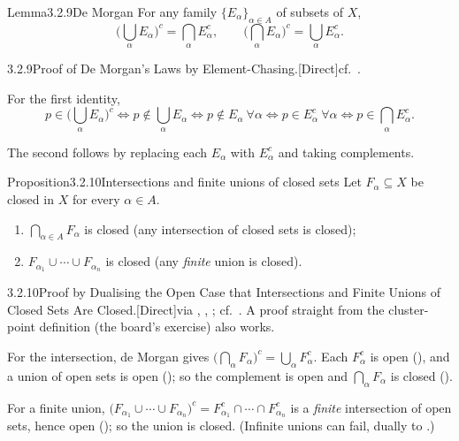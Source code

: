 \documentclass[main.tex]{subfiles}
\begin{document}
\begin{Obj}{Lemma}{3.2.9}{De Morgan}
For any family $\{E_\alpha\}_{\alpha\in A}$ of subsets of $X$,
\[ \Big(\bigcup_{\alpha}E_\alpha\Big)^c=\bigcap_\alpha E_\alpha^c,\qquad
   \Big(\bigcap_{\alpha}E_\alpha\Big)^c=\bigcup_\alpha E_\alpha^c. \]
\end{Obj}
\begin{Prf}{3.2.9}{Proof of De Morgan's Laws by Element-Chasing.}{[Direct]\quad cf.\ .}
\item For the first identity,
  \[ p\in\Big(\bigcup_\alpha E_\alpha\Big)^c \iff p\notin\bigcup_\alpha E_\alpha
     \iff p\notin E_\alpha\ \forall\alpha \iff p\in E_\alpha^c\ \forall\alpha
     \iff p\in\bigcap_\alpha E_\alpha^c. \]
\item The second follows by replacing each $E_\alpha$ with $E_\alpha^c$ and taking complements.
\end{Prf}

\begin{Obj}{Proposition}{3.2.10}{Intersections and finite unions of closed sets}
Let $F_\alpha\subseteq X$ be closed in $X$ for every $\alpha\in A$.
\begin{enumerate}
  \item $\bigcap_{\alpha\in A}F_\alpha$ is closed (any intersection of closed sets is closed);
  \item $F_{\alpha_1}\cup\cdots\cup F_{\alpha_n}$ is closed (any \emph{finite} union is closed).
\end{enumerate}
\end{Obj}
\begin{Prf}{3.2.10}{Proof by Dualising the Open Case that Intersections and Finite Unions of Closed Sets Are Closed.}{[Direct]\quad via , , ; cf.\ . A proof straight from the cluster-point definition (the board's exercise) also works.}
\item For the intersection, de Morgan gives $\big(\bigcap_\alpha F_\alpha\big)^c=\bigcup_\alpha F_\alpha^c$.
  Each $F_\alpha^c$ is open (), and a union of open sets is open (); so the
  complement is open and $\bigcap_\alpha F_\alpha$ is closed ().
\item For a finite union, $\big(F_{\alpha_1}\cup\cdots\cup F_{\alpha_n}\big)^c=F_{\alpha_1}^c\cap
  \cdots\cap F_{\alpha_n}^c$ is a \emph{finite} intersection of open sets, hence open ();
  so the union is closed. (Infinite unions can fail, dually to .)
\end{Prf}
\end{document}
